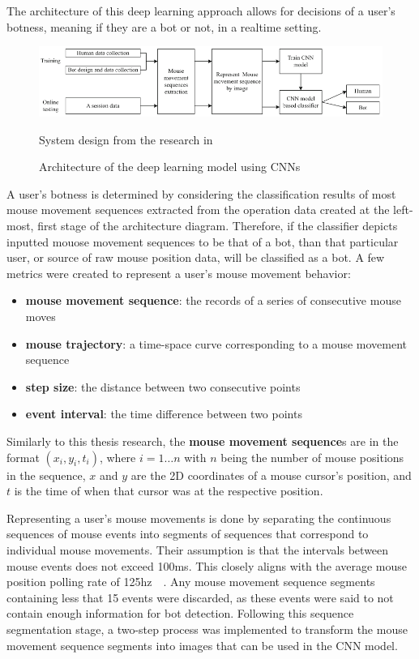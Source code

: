 The architecture of this deep learning approach allows for decisions of a user's botness, meaning if they are a bot or not, in a realtime setting.
\begin{figure}[!h]
    \centering
    \includegraphics[width=1\columnwidth]{figures/deep_learning_with_mouse_dynamics_system_architecture}
    \caption{Architecture of the deep learning model using CNNs}
    {\small System design from the research in~\cite{deep_learning_detection_with_mouse_behavior}}
    \label{fig:deep-learning-architecture}
\end{figure}
A user's botness is determined by considering the classification results of most mouse movement sequences extracted from the operation data created at the left-most, first stage of the architecture diagram.
Therefore, if the classifier depicts inputted mouose movement sequences to be that of a bot, than that particular user, or source of raw mouse position data, will be classified as a bot.
A few metrics were created to represent a user's mouse movement behavior:
\begin{itemize}
    \item \textbf{mouse movement sequence}: the records of a series of consecutive mouse moves
    \item \textbf{mouse trajectory}: a time-space curve corresponding to a mouse movement sequence
    \item \textbf{step size}: the distance between two consecutive points
    \item \textbf{event interval}: the time difference between two points
\end{itemize}
Similarly to this thesis research, the \textbf{mouse movement sequence}s are in the format $(x_i, y_i, t_i)$, where $i = 1{\dots}n$ with $n$ being the number of mouse positions in the sequence, $x$ and $y$ are the 2D coordinates of a mouse cursor's position, and $t$ is the time of when that cursor was at the respective position.

Representing a user's mouse movements is done by separating the continuous sequences of mouse events into segments of sequences that correspond to individual mouse movements.
Their assumption is that the intervals between mouse events does not exceed 100ms.
This closely aligns with the average mouse position polling rate of 125hz~\cite{mouse_dpi_and_polling_rate_explained}~\cite{mouse_dpi_and_usb_polling_rate}.
Any mouse movement sequence segments containing less that 15 events were discarded, as these events were said to not contain enough information for bot detection.
Following this sequence segmentation stage, a two-step process was implemented to transform the mouse movement sequence segments into images that can be used in the CNN model.

